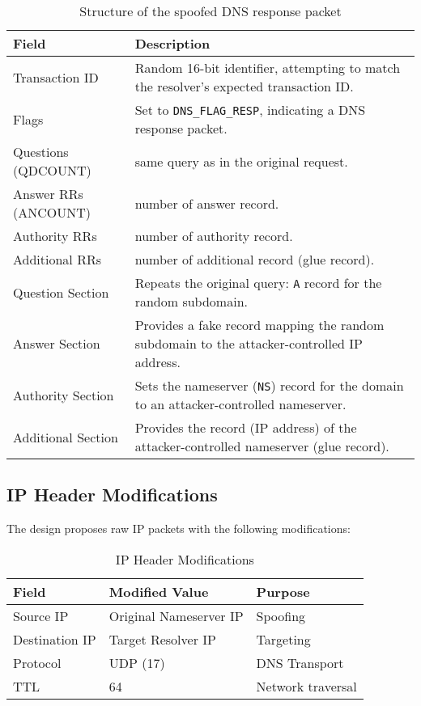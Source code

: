 \documentclass[12pt,a4paper]{article}
\begin{document}
\begin{table}[H]
\centering
\begin{tabular}{|l|p{8cm}|}
\hline
\textbf{Field} & \textbf{Description} \\
\hline
Transaction ID & Random 16-bit identifier, attempting to match the resolver’s expected transaction ID. \\
\hline
Flags & Set to \texttt{DNS\_FLAG\_RESP}, indicating a DNS response packet. \\
\hline
Questions (QDCOUNT) & same query as in the original request. \\
\hline
Answer RRs (ANCOUNT) & number of answer record. \\
\hline
Authority RRs & number of authority record. \\
\hline
Additional RRs & number of  additional record (glue record). \\
\hline
Question Section & Repeats the original query: \texttt{A} record for the random subdomain. \\
\hline
Answer Section & Provides a fake  record mapping the random subdomain to the attacker-controlled IP address. \\
\hline
Authority Section & Sets the nameserver (\texttt{NS}) record for the domain to an attacker-controlled nameserver. \\
\hline
Additional Section & Provides the record (IP address) of the attacker-controlled nameserver (glue record). \\
\hline
\end{tabular}
\caption{Structure of the spoofed DNS response packet}
\end{table}


\subsection{IP Header Modifications}

The design proposes raw IP packets with the following modifications:

\begin{table}[H]
\centering
\begin{tabular}{|l|l|l|}
\hline
\textbf{Field} & \textbf{Modified Value} & \textbf{Purpose} \\
\hline
Source IP & Original Nameserver IP & Spoofing \\
Destination IP & Target Resolver IP & Targeting \\
Protocol & UDP (17) & DNS Transport \\
TTL & 64 & Network traversal \\
\hline
\end{tabular}
\caption{IP Header Modifications}
\label{tab:ip_header}
\end{table}
\end{document}
